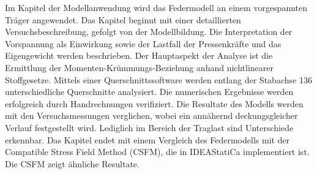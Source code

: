 Im Kapitel der Modellanwendung wird das Federmodell an einem vorgespannten Träger angewendet. Das Kapitel beginnt mit einer detaillierten Versuchsbeschreibung, gefolgt von der Modellbildung. Die Interpretation der Vorspannung als Einwirkung sowie der Lastfall der Pressenkräfte und das Eigengewicht werden beschrieben. Der Hauptaspekt der Analyse ist die Ermittlung der Momenten-Krümmungs-Beziehung anhand nichtlinearer Stoffgesetze. Mittels einer Querschnittssoftware werden entlang der Stabachse 136 unterschiedliche Querschnitte analysiert. Die numerischen Ergebnisse werden erfolgreich durch Handrechnungen verifiziert. Die Resultate des Modells werden mit den Versuchsmessungen verglichen, wobei ein annähernd deckungsgleicher Verlauf festgestellt wird. Lediglich im Bereich der Traglast sind Unterschiede erkennbar. Das Kapitel endet mit einem Vergleich des Federmodells mit der Compatible Stress Field Method (CSFM), die in IDEAStatiCa implementiert ist. Die CSFM zeigt ähnliche Resultate.
